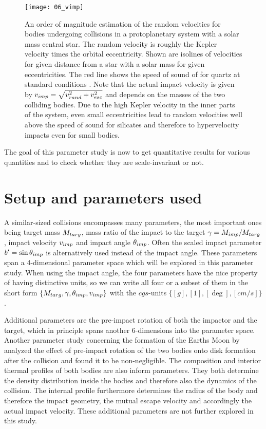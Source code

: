 \begin{figure}
\begin{center}
\texttt{[image: 06\_vimp]}
\caption{An order of magnitude estimation of the random velocities for bodies undergoing collisions in a protoplanetary system with a solar mass central star. The random velocity is roughly the Kepler velocity times the orbital eccentricity. Shown are isolines of velocities for given distance from a star with a solar mass for given eccentricities. The red line shows the speed of sound of for quartz at standard conditions \cite{Melosh:2007p3502}. Note that the actual impact velocity is given by $v_{imp} = \sqrt{ v_{rand}^2 + v_{esc}^2}$ and depends on the masses of the two colliding bodies. Due to the high Kepler velocity in the inner parts of the system, even small eccentricities lead to random velocities well above the speed of sound for silicates and therefore to hypervelocity impacts even for small bodies.}
\label{ch03_fig06}
\end{center}
\end{figure}
The goal of this parameter study is now to get quantitative results for various quantities and to check whether they are scale-invariant or not.

\section{Setup and parameters used}
A similar-sized collisions encompasses many parameters, the most important ones being target mass $M_{targ}$, mass ratio of the impact to the target $\gamma = M_{imp} / M_{targ}$, impact velocity $v_{imp}$ and impact angle $\theta_{imp}$. Often the scaled impact parameter $b'=\sin{\theta_{imp}}$ is alternatively used instead of the impact angle. These parameters span a 4-dimensional parameter space which will be explored in this parameter study. When using the impact angle, the four parameters have the nice property of having distinctive units, so we can write all four or a subset of them in the short form $\{M_{targ}, \gamma, \theta_{imp}, v_{imp}\}$ with the $cgs$-units $\{[g], [1], [\deg], [cm/s]\}$.

Additional parameters are the pre-impact rotation of both the impactor and the target, which in principle spans another 6-dimensions into the parameter space. Another parameter study concerning the formation of the Earths Moon by \cite{Canup:2008p3551} analyzed the effect of pre-impact rotation of the two bodies onto disk formation after the collision and found it to be non-negligible. The composition and interior thermal profiles of both bodies are also inform parameters. They both determine the density distribution inside the bodies and therefore also the dynamics of the collision. The internal profile furthermore determines the radius of the body and therefore the impact geometry, the mutual escape velocity and accordingly the actual impact velocity. These additional parameters are not further explored in this study.

